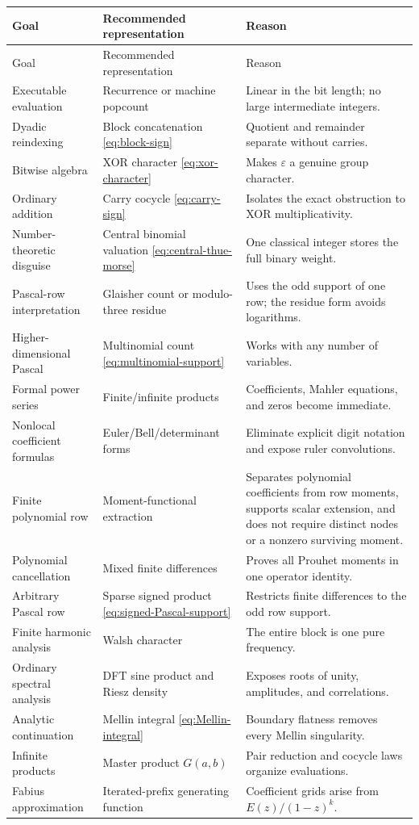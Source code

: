 \documentclass[11pt,oneside]{article}
\numberwithin{equation}{section}
\theoremstyle{definition}
\theoremstyle{remark}
\newcommand{\eps}{\varepsilon}
\begin{document}
\renewcommand{\arraystretch}{1.16}
\begin{longtable}{@{}>{\raggedright\arraybackslash}p{}>{\raggedright\arraybackslash}p{}>{\raggedright\arraybackslash}p{}@{}}
\toprule
Goal & Recommended representation & Reason \\
\midrule
\endfirsthead
\toprule
Goal & Recommended representation & Reason \\
\midrule
\endhead
Executable evaluation & Recurrence or machine popcount & Linear in the bit length; no large intermediate integers. \\
Dyadic reindexing & Block concatenation \eqref{eq:block-sign} & Quotient and remainder separate without carries. \\
Bitwise algebra & XOR character \eqref{eq:xor-character} & Makes \(\eps\) a genuine group character. \\
Ordinary addition & Carry cocycle \eqref{eq:carry-sign} & Isolates the exact obstruction to XOR multiplicativity. \\
Number-theoretic disguise & Central binomial valuation \eqref{eq:central-thue-morse} & One classical integer stores the full binary weight. \\
Pascal-row interpretation & Glaisher count or modulo-three residue & Uses the odd support of one row; the residue form avoids logarithms. \\
Higher-dimensional Pascal & Multinomial count \eqref{eq:multinomial-support} & Works with any number of variables. \\
Formal power series & Finite/infinite products & Coefficients, Mahler equations, and zeros become immediate. \\
Nonlocal coefficient formulas & Euler/Bell/determinant forms & Eliminate explicit digit notation and expose ruler convolutions. \\
Finite polynomial row & Moment-functional extraction & Separates polynomial coefficients from row moments, supports scalar extension, and does not require distinct nodes or a nonzero surviving moment. \\
Polynomial cancellation & Mixed finite differences & Proves all Prouhet moments in one operator identity. \\
Arbitrary Pascal row & Sparse signed product \eqref{eq:signed-Pascal-support} & Restricts finite differences to the odd row support. \\
Finite harmonic analysis & Walsh character & The entire block is one pure frequency. \\
Ordinary spectral analysis & DFT sine product and Riesz density & Exposes roots of unity, amplitudes, and correlations. \\
Analytic continuation & Mellin integral \eqref{eq:Mellin-integral} & Boundary flatness removes every Mellin singularity. \\
Infinite products & Master product \(G(a,b)\) & Pair reduction and cocycle laws organize evaluations. \\
Fabius approximation & Iterated-prefix generating function & Coefficient grids arise from \(E(z)/(1-z)^k\). \\
\bottomrule
\end{longtable}
\renewcommand{\arraystretch}{1}
\end{document}
